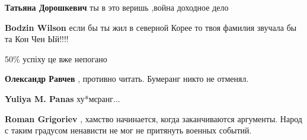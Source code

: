 \begin{itemize}
\begin{itemize}
\begin{itemize}
\textbf{Татьяна Дорошкевич} ты в это веришь ,война доходное дело
\end{itemize}

 
\textbf{Bodzin Wilson} если бы ты жил в северной Корее то твоя фамилия звучала бы та Кон Чен Ый!!!!

\end{itemize}


50\% успіху це вже непогано \Smiley[1.0][yellow]

\begin{itemize}
 
\textbf{Олександр Равчев} , противно читать. Бумеранг никто не отменял.

\begin{itemize}
 
\textbf{Yuliya M. Panas} ху*мєранг...

 
\textbf{Roman Grigoriev} , хамство начинается, когда заканчиваются аргументы. Народ с таким градусом ненависти не мог не притянуть военных событий.

 

\end{itemize}
\end{itemize}
\end{itemize}
